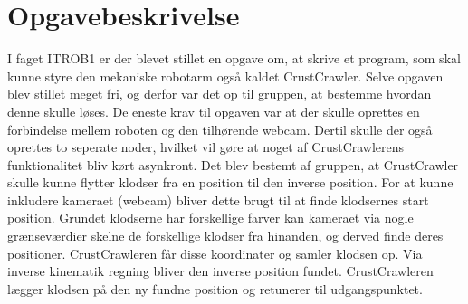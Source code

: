 \chapter{Opgavebeskrivelse}\label{chap:Opgavebeskrivelse}
I faget ITROB1 er der blevet stillet en opgave om, at skrive et program, som skal kunne styre den mekaniske robotarm også kaldet CrustCrawler. Selve opgaven blev stillet meget fri, og derfor var det op til gruppen, at bestemme hvordan denne skulle løses. De eneste krav til opgaven var at der skulle oprettes en forbindelse mellem roboten og den tilhørende webcam. Dertil skulle der også oprettes to seperate noder, hvilket vil gøre at noget af CrustCrawlerens funktionalitet bliv kørt asynkront. \newline
Det blev bestemt af gruppen, at CrustCrawler skulle kunne flytter klodser fra en position til den inverse position. For at kunne inkludere kameraet (webcam) bliver dette brugt til at finde klodsernes start position. Grundet klodserne har forskellige farver kan kameraet via nogle grænseværdier skelne de forskellige klodser fra hinanden, og derved finde deres positioner. CrustCrawleren får disse koordinater og samler klodsen op. Via inverse kinematik regning bliver den inverse position fundet. CrustCrawleren lægger klodsen på den ny fundne position og retunerer til udgangspunktet. 

